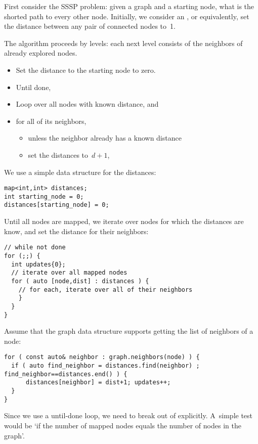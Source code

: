 First consider the \ac{SSSP} problem:
given a graph and a starting node,
what is the shorted path to every other node.
Initially, we consider an ,
or equivalently, set the distance between any pair of connected
nodes to~1.

The algorithm proceeds by levels: each next level consists of
the neighbors of already explored nodes.

\begin{itemize}
\item Set the distance to the starting node to zero.
\item Until done,
\item Loop over all nodes with known distance, and
\item for all of its neighbors,
  \begin{itemize}
  \item unless the neighbor already has a known distance
  \item set the distances to~$d+1$,
  \end{itemize}
\end{itemize}

We use a simple data structure for the distances:
\begin{lstlisting}
map<int,int> distances;  
int starting_node = 0;
distances[starting_node] = 0;
\end{lstlisting}

Until all nodes are mapped,
we iterate over nodes for which the distances are know, 
and set the distance for their neighbors:

\begin{lstlisting}
// while not done
for (;;) {
  int updates{0};
  // iterate over all mapped nodes
  for ( auto [node,dist] : distances ) {
    // for each, iterate over all of their neighbors
    }
  }
}  
\end{lstlisting}

Assume that the graph data structure supports
getting the list of neighbors of a node:
\begin{lstlisting}
for ( const auto& neighbor : graph.neighbors(node) ) {
  if ( auto find_neighbor = distances.find(neighbor) ; find_neighbor==distances.end() ) {
      distances[neighbor] = dist+1; updates++;
  }
}
\end{lstlisting}

Since we use a until-done loop, we need to break out of explicitly.
A~simple test would be `if the number of mapped nodes equals the number
of nodes in the graph'.

